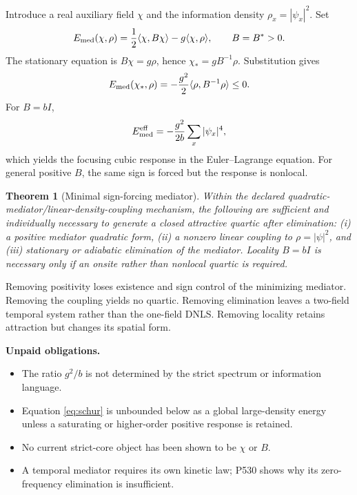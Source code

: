 \documentclass[11pt,a4paper]{article}
\newtheorem{theorem}{Theorem}[section]
\begin{document}
Introduce a real auxiliary field $\chi$ and the information density $\rho_x=|\psi_x|^2$. Set
\begin{equation}
 E_{\rm med}(\chi,\rho)=\frac12\langle\chi,B\chi\rangle-g\langle\chi,\rho\rangle,
 \qquad B=B^*>0.                                  \label{eq:mediator}
\end{equation}
The stationary equation is $B\chi=g\rho$, hence $\chi_*=gB^{-1}\rho$. Substitution gives
\begin{equation}
 E_{\rm med}(\chi_*,\rho)=-\frac{g^2}{2}\langle\rho,B^{-1}\rho\rangle\le0. \label{eq:schur}
\end{equation}
For $B=bI$,
\[
 E_{\rm med}^{\rm eff}=-\frac{g^2}{2b}\sum_x|\psi_x|^4,
\]
which yields the focusing cubic response in the Euler--Lagrange equation. For general positive $B$, the same sign is forced but the response is nonlocal.

\begin{theorem}[Minimal sign-forcing mediator]
Within the declared quadratic-mediator/linear-density-coupling mechanism, the following are sufficient and individually necessary to generate a closed attractive quartic after elimination: (i) a positive mediator quadratic form, (ii) a nonzero linear coupling to $\rho=|\psi|^2$, and (iii) stationary or adiabatic elimination of the mediator. Locality $B=bI$ is necessary only if an onsite rather than nonlocal quartic is required.
\end{theorem}

Removing positivity loses existence and sign control of the minimizing mediator. Removing the coupling yields no quartic. Removing elimination leaves a two-field temporal system rather than the one-field DNLS. Removing locality retains attraction but changes its spatial form.

\textbf{Unpaid obligations.}
\begin{itemize}
\item The ratio $g^2/b$ is not determined by the strict spectrum or information language.
\item Equation \eqref{eq:schur} is unbounded below as a global large-density energy unless a saturating or higher-order positive response is retained.
\item No current strict-core object has been shown to be $\chi$ or $B$.
\item A temporal mediator requires its own kinetic law; P530 shows why its zero-frequency elimination is insufficient.
\end{itemize}
\end{document}

